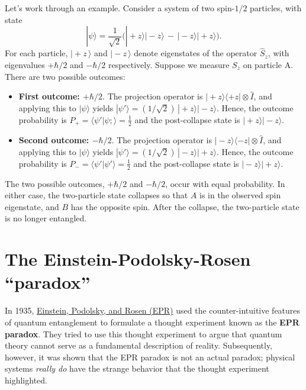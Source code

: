 \documentclass[pra,12pt]{revtex4}
\begin{document}
Let's work through an example.  Consider a system of two spin-$1/2$
particles, with state
\begin{equation}
  |\psi\rangle = \frac{1}{\sqrt{2}} \Big(|\!+\!z\rangle|\!-\!z\rangle \,-\, |\!-\!z\rangle|\!+\!z\rangle\Big).
\end{equation}
For each particle, $|\!+\!z\,\rangle$ and $|\!-\!z\,\rangle$ denote
eigenstates of the operator $\hat{S}_z$, with eigenvalues $+\hbar/2$
and $-\hbar/2$ respectively.  Suppose we measure $S_z$ on particle A.
There are two possible outcomes:
\begin{itemize}
\item \textbf{First outcome: $+\hbar/2$}.  The projection operator is
  $|\!+\!z\rangle\langle+z| \otimes \hat{I}$, and applying this to
  $|\psi\rangle$ yields $|\psi'\rangle =
  (1/\sqrt{2})\,|\!+\!z\rangle|\!-\!z\rangle$.  Hence, the outcome
  probability is $P_+ = \langle \psi'|\psi;\rangle = \frac{1}{2}$ and
  the post-collapse state is $|\!+\!z\rangle |\!-\!z\rangle$.

\item \textbf{Second outcome: $-\hbar/2$}.  The projection operator is
  $|\!-\!z\rangle\langle-z| \otimes \hat{I}$, and applying this to
  $|\psi\rangle$ yields $|\psi'\rangle =
  (1/\sqrt{2})\,|\!-\!z\rangle|\!+\!z\rangle$.  Hence, the outcome
  probability is $P_- = \langle \psi'|\psi'\rangle = \frac{1}{2}$ and
  the post-collapse state is $|\!-\!z\rangle |\!+\!z\rangle$.
\end{itemize}
The two possible outcomes, $+\hbar/2$ and $-\hbar/2$, occur with equal
probability.  In either case, the two-particle state collapses so that
$A$ is in the observed spin eigenstate, and $B$ has the opposite spin.
After the collapse, the two-particle state is no longer entangled.

\section{The Einstein-Podolsky-Rosen ``paradox''}

In 1935, \hyperref[cite:epr]{Einstein, Podolsky, and Rosen (EPR)} used
the counter-intuitive features of quantum entanglement to formulate a
thought experiment known as the \textbf{EPR paradox}.  They tried to
use this thought experiment to argue that quantum theory cannot serve
as a fundamental description of reality.  Subsequently, however, it
was shown that the EPR paradox is not an actual paradox; physical
systems \textit{really do} have the strange behavior that the thought
experiment highlighted.
\end{document}
